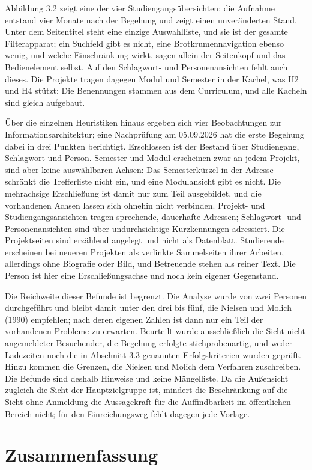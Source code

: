 Abbildung 3.2 zeigt eine der vier Studiengangsübersichten; die Aufnahme entstand vier Monate nach der Begehung und zeigt einen unveränderten Stand. Unter dem Seitentitel steht eine einzige Auswahlliste, und sie ist der gesamte Filterapparat; ein Suchfeld gibt es nicht, eine Brotkrumennavigation ebenso wenig, und welche Einschränkung wirkt, sagen allein der Seitenkopf und das Bedienelement selbst. Auf den Schlagwort- und Personenansichten fehlt auch dieses. Die Projekte tragen dagegen Modul und Semester in der Kachel, was H2 und H4 stützt: Die Benennungen stammen aus dem Curriculum, und alle Kacheln sind gleich aufgebaut.

Über die einzelnen Heuristiken hinaus ergeben sich vier Beobachtungen zur Informationsarchitektur; eine Nachprüfung am 05.09.2026 hat die erste Begehung dabei in drei Punkten berichtigt. Erschlossen ist der Bestand über Studiengang, Schlagwort und Person. Semester und Modul erscheinen zwar an jedem Projekt, sind aber keine auswählbaren Achsen: Das Semesterkürzel in der Adresse schränkt die Trefferliste nicht ein, und eine Modulansicht gibt es nicht. Die mehrachsige Erschließung ist damit nur zum Teil ausgebildet, und die vorhandenen Achsen lassen sich ohnehin nicht verbinden. Projekt- und Studiengangsansichten tragen sprechende, dauerhafte Adressen; Schlagwort- und Personenansichten sind über undurchsichtige Kurzkennungen adressiert. Die Projektseiten sind erzählend angelegt und nicht als Datenblatt. Studierende erscheinen bei neueren Projekten als verlinkte Sammelseiten ihrer Arbeiten, allerdings ohne Biografie oder Bild, und Betreuende stehen als reiner Text. Die Person ist hier eine Erschließungsachse und noch kein eigener Gegenstand.

Die Reichweite dieser Befunde ist begrenzt. Die Analyse wurde von zwei Personen durchgeführt und bleibt damit unter den drei bis fünf, die Nielsen und Molich (1990) empfehlen; nach deren eigenen Zahlen ist dann nur ein Teil der vorhandenen Probleme zu erwarten. Beurteilt wurde ausschließlich die Sicht nicht angemeldeter Besuchender, die Begehung erfolgte stichprobenartig, und weder Ladezeiten noch die in Abschnitt 3.3 genannten Erfolgskriterien wurden geprüft. Hinzu kommen die Grenzen, die Nielsen und Molich dem Verfahren zuschreiben. Die Befunde sind deshalb Hinweise und keine Mängelliste. Da die Außensicht zugleich die Sicht der Hauptzielgruppe ist, mindert die Beschränkung auf die Sicht ohne Anmeldung die Aussagekraft für die Auffindbarkeit im öffentlichen Bereich nicht; für den Einreichungsweg fehlt dagegen jede Vorlage.

\section{Zusammenfassung}
\label{sec:zusammenfassung-grundlagen}

